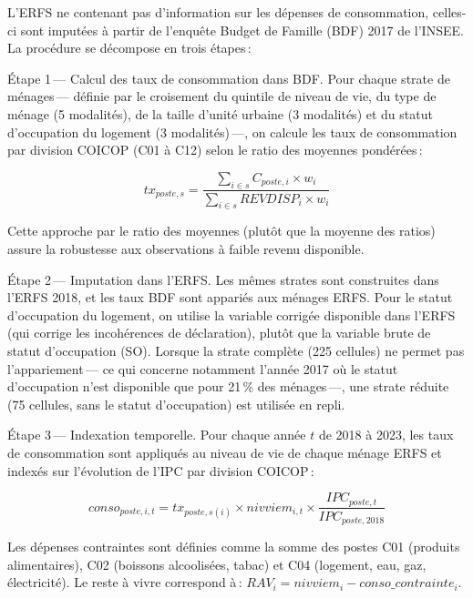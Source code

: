 \documentclass[
  french,
  9pt,
  a4paper,
]{article}
\begin{document}
\begin{tcolorbox}[enhanced jigsaw, leftrule=.75mm, breakable, toptitle=1mm, toprule=.15mm, title={Encadré 6\,--- Imputation de la consommation dans l'ERFS}, opacityback=0, arc=.35mm, opacitybacktitle=0.6, colback=white, coltitle=black, colframe=quarto-callout-note-color-frame, left=2mm, colbacktitle=quarto-callout-note-color!10!white, bottomtitle=1mm, titlerule=0mm, rightrule=.15mm, bottomrule=.15mm]

L'ERFS ne contenant pas d'information sur les dépenses de consommation,
celles-ci sont imputées à partir de l'enquête Budget de Famille (BDF)
2017 de l'INSEE. La procédure se décompose en trois étapes\,:

Étape 1\,--- Calcul des taux de consommation dans BDF. Pour chaque
strate de ménages\,--- définie par le croisement du quintile de niveau
de vie, du type de ménage (5 modalités), de la taille d'unité urbaine (3
modalités) et du statut d'occupation du logement (3 modalités)\,---, on
calcule les taux de consommation par division COICOP (C01 à C12) selon
le ratio des moyennes pondérées\,:

\[tx_{poste,s} = \frac{\sum_{i \in s} C_{poste,i} \times w_i}{\sum_{i \in s} REVDISP_i \times w_i}\]

Cette approche par le ratio des moyennes (plutôt que la moyenne des
ratios) assure la robustesse aux observations à faible revenu
disponible.

Étape 2\,--- Imputation dans l'ERFS. Les mêmes strates sont construites
dans l'ERFS 2018, et les taux BDF sont appariés aux ménages ERFS. Pour
le statut d'occupation du logement, on utilise la variable corrigée
disponible dans l'ERFS (qui corrige les incohérences de déclaration),
plutôt que la variable brute de statut d'occupation (SO). Lorsque la
strate complète (225 cellules) ne permet pas l'appariement\,--- ce qui
concerne notamment l'année 2017 où le statut d'occupation n'est
disponible que pour 21\,\% des ménages\,---, une strate réduite (75
cellules, sans le statut d'occupation) est utilisée en repli.

Étape 3\,--- Indexation temporelle. Pour chaque année \(t\) de 2018 à
2023, les taux de consommation sont appliqués au niveau de vie de chaque
ménage ERFS et indexés sur l'évolution de l'IPC par division COICOP\,:

\[conso_{poste,i,t} = tx_{poste,s(i)} \times nivviem_{i,t} \times \frac{IPC_{poste,t}}{IPC_{poste,2018}}\]

Les dépenses contraintes sont définies comme la somme des postes C01
(produits alimentaires), C02 (boissons alcoolisées, tabac) et C04
(logement, eau, gaz, électricité). Le reste à vivre correspond à\,:
\(RAV_i = nivviem_i - conso\_contrainte_i\).

\end{tcolorbox}
\end{document}
